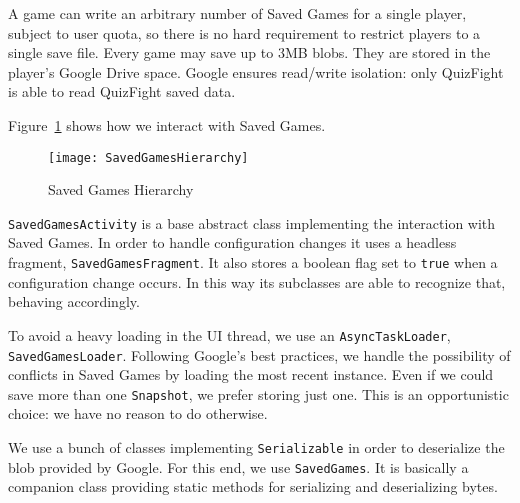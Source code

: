 A game can write an arbitrary number of Saved Games for a single player,
subject to user quota, so there is no hard requirement to restrict players
to a single save file.
Every game may save up to 3MB blobs. They are stored in the player's Google
Drive space. Google ensures read/write isolation: only QuizFight is able to
read QuizFight saved data.

Figure~\ref{fig:saved-games-hierarchy} shows how we interact with Saved
Games.

\begin{figure}[h]
	\centering
	\texttt{[image: SavedGamesHierarchy]}
	\caption{Saved Games Hierarchy}
	\label{fig:saved-games-hierarchy}
\end{figure}

\texttt{SavedGamesActivity} is a base abstract class implementing the
interaction with Saved Games. In order to handle configuration changes
it uses a headless fragment, \texttt{SavedGamesFragment}.
It also stores a boolean flag set to \texttt{true} when a configuration
change occurs. In this way its subclasses are able to recognize that,
behaving accordingly. 

To avoid a heavy loading in the UI thread, we use an
\texttt{AsyncTaskLoader}, \texttt{SavedGamesLoader}.
Following Google's best practices, we handle the possibility of conflicts
in Saved Games by loading the most recent instance. Even if we could save
more than one \texttt{Snapshot}, we prefer storing just one.
This is an opportunistic choice: we have no reason to do otherwise.

We use a bunch of classes implementing \texttt{Serializable} in order to
deserialize the blob provided by Google. For this end, we use
\texttt{SavedGames}.
It is basically a companion class providing static methods for serializing
and deserializing bytes. 
